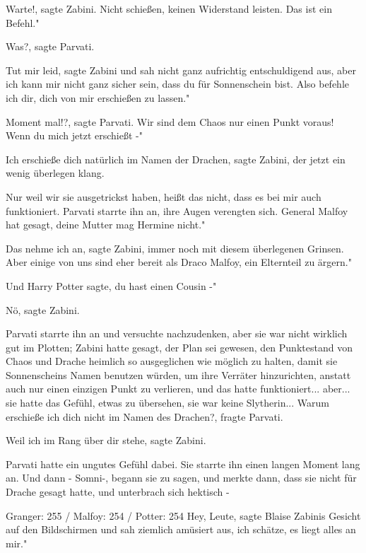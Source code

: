 \glqq Warte!\grqq{}, sagte Zabini. \glqq Nicht schießen, keinen Widerstand
leisten. Das ist ein Befehl."

\glqq Was?\grqq{}, sagte Parvati.

\glqq Tut mir leid\grqq{}, sagte Zabini und sah nicht ganz aufrichtig
entschuldigend aus, \glqq aber ich kann mir nicht ganz sicher sein, dass du für
Sonnenschein bist. Also befehle ich dir, dich von mir erschießen zu lassen."

\glqq Moment mal!?\grqq{}, sagte Parvati. \glqq Wir sind dem Chaos nur einen
Punkt voraus! Wenn du mich jetzt erschießt -"

\glqq Ich erschieße dich natürlich im Namen der Drachen\grqq{}, sagte Zabini,
der jetzt ein wenig überlegen klang.

\glqq Nur weil wir sie ausgetrickst haben, heißt das nicht, dass es bei mir auch
funktioniert.\grqq{} Parvati starrte ihn an, ihre Augen verengten sich. \glqq
General Malfoy hat gesagt, deine Mutter mag Hermine nicht."

\glqq Das nehme ich an\grqq{}, sagte Zabini, immer noch mit diesem überlegenen
Grinsen. \glqq Aber einige von uns sind eher bereit als Draco Malfoy, ein
Elternteil zu ärgern."

\glqq Und Harry Potter sagte, du hast einen Cousin -"

\glqq Nö\grqq{}, sagte Zabini.

Parvati starrte ihn an und versuchte nachzudenken, aber sie war nicht wirklich
gut im Plotten; Zabini hatte gesagt, der Plan sei gewesen, den Punktestand von
Chaos und Drache heimlich so ausgeglichen wie möglich zu halten, damit sie
Sonnenscheins Namen benutzen würden, um ihre Verräter hinzurichten, anstatt auch
nur einen einzigen Punkt zu verlieren, und das hatte funktioniert... aber... sie
hatte das Gefühl, etwas zu übersehen, sie war keine Slytherin... \glqq Warum
erschieße ich dich nicht im Namen des Drachen?\grqq{}, fragte Parvati.

\glqq Weil ich im Rang über dir stehe\grqq{}, sagte Zabini.

Parvati hatte ein ungutes Gefühl dabei. Sie starrte ihn einen langen Moment lang
an. Und dann - \glqq Somni-\grqq{}, begann sie zu sagen, und merkte dann, dass
sie nicht für Drache gesagt hatte, und unterbrach sich hektisch -

Granger: 255 / Malfoy: 254 / Potter: 254 \glqq Hey, Leute\grqq{}, sagte Blaise
Zabinis Gesicht auf den Bildschirmen und sah ziemlich amüsiert aus, \glqq ich
schätze, es liegt alles an mir."


